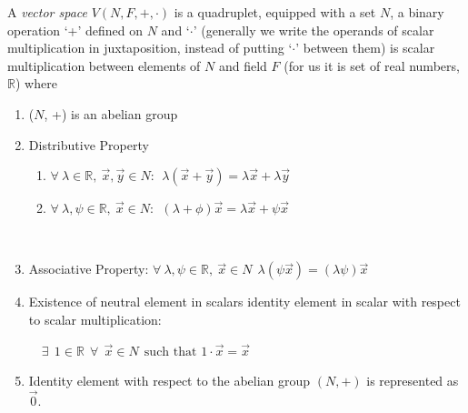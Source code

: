 \documentclass{article}
\begin{document}
A \textit{vector space} $V(N, F, + , \cdot)$ is a quadruplet, equipped with a set $N$, a binary operation `+' defined on $N$ and `$\cdot$' (generally we write the operands of scalar multiplication in juxtaposition, instead of putting `$\cdot$' between them) is scalar multiplication between elements of $N$ and field $F$ (for us it is set of real numbers, $\mathbb{R}$) where 
\begin{enumerate}
    \item ($N$, +) is an abelian group
    \item Distributive Property 
    \begin{enumerate}
        \item \begin{math}
            \forall ~ \lambda \in \mathbb{R}, ~ \vec{x}, \vec{y} \in N : ~~ \lambda(\vec{x} + \vec{y}) = \lambda\vec{x} + \lambda\vec{y}
        \end{math}
        \item \begin{math}
            \forall ~ \lambda, \psi \in \mathbb{R}, ~ \vec{x} \in N : ~~ (\lambda + \phi)\vec{x} = \lambda\vec{x} + \psi\vec{x}
        \end{math}
    \end{enumerate}\
    \item Associative Property: 
        \begin{math}\forall ~ \lambda, \psi \in \mathbb{R}, ~ \vec{x} \in N  ~~ \lambda(\psi\vec{x}) = (\lambda \psi)\vec{x}
        \end{math}
    \item Existence of neutral element in scalars
         identity element in scalar with respect to scalar multiplication: \par~~\begin{math}\exists~~ 1 \in \mathbb{R} ~~ \forall ~~ \vec{x} \in N ~~\text{such that }1\cdot\vec{x} = \vec{x}\end{math}
            
    \item Identity element with respect to the abelian group $(N , +)$ is represented as $\vec{0}$.
        
\end{enumerate}
\end{document}
